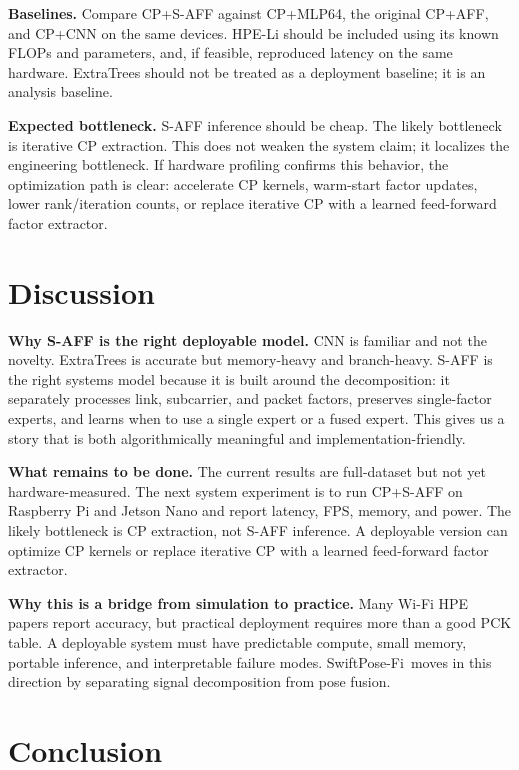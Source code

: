 \documentclass[10pt,conference]{IEEEtran}
\newcommand{\method}{SwiftPose-Fi}
\begin{document}
\textbf{Baselines.}
Compare CP+S-AFF against CP+MLP64, the original CP+AFF, and CP+CNN on the same devices. HPE-Li should be included using its known FLOPs and parameters, and, if feasible, reproduced latency on the same hardware. ExtraTrees should not be treated as a deployment baseline; it is an analysis baseline.

\textbf{Expected bottleneck.}
S-AFF inference should be cheap. The likely bottleneck is iterative CP extraction. This does not weaken the system claim; it localizes the engineering bottleneck. If hardware profiling confirms this behavior, the optimization path is clear: accelerate CP kernels, warm-start factor updates, lower rank/iteration counts, or replace iterative CP with a learned feed-forward factor extractor.

\section{Discussion}

\textbf{Why S-AFF is the right deployable model.}
CNN is familiar and not the novelty. ExtraTrees is accurate but memory-heavy and branch-heavy. S-AFF is the right systems model because it is built around the decomposition: it separately processes link, subcarrier, and packet factors, preserves single-factor experts, and learns when to use a single expert or a fused expert. This gives us a story that is both algorithmically meaningful and implementation-friendly.

\textbf{What remains to be done.}
The current results are full-dataset but not yet hardware-measured. The next system experiment is to run CP+S-AFF on Raspberry Pi and Jetson Nano and report latency, FPS, memory, and power. The likely bottleneck is CP extraction, not S-AFF inference. A deployable version can optimize CP kernels or replace iterative CP with a learned feed-forward factor extractor.

\textbf{Why this is a bridge from simulation to practice.}
Many Wi-Fi HPE papers report accuracy, but practical deployment requires more than a good PCK table. A deployable system must have predictable compute, small memory, portable inference, and interpretable failure modes. \method\ moves in this direction by separating signal decomposition from pose fusion.

\section{Conclusion}
\end{document}
